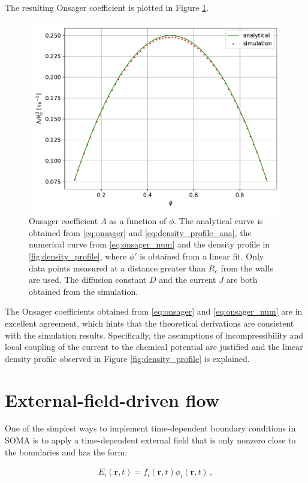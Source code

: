 \documentclass[bachelor,       %
               twoside,        %
               BCOR10mm,       %
               ngerman, english %
               ]{GAUBM}
\begin{document}
The resulting Onsager coefficient is plotted in Figure \ref{fig:onsager_coeff}.

\begin{figure}[h]
  \centering
  \includegraphics[width=0.6\linewidth]{figures/onsager_coll_diff.pdf}
  \caption{Onsager coefficient $\Lambda$ as a function of $\phi$. The analytical curve is obtained from \eqref{eq:onsager} and \eqref{eq:density_profile_ana}, the numerical curve from \eqref{eq:onsager_num} and the density profile in \ref{fig:density_profile}, where $\phi'$ is obtained from a linear fit. Only data points measured at a distance greater than $R_e$ from the walls are used. The diffusion constant $D$ and the current $J$ are both obtained from the simulation.}
  \label{fig:onsager_coeff}
\end{figure}

The Onsager coefficients obtained from \eqref{eq:onsager} and \eqref{eq:onsager_num} are in excellent agreement, which hints that the theoretical derivations are consistent with the simulation results. 
Specifically, the assumptions of incompressibility and local coupling of the current to the chemical potential are justified and the linear density profile observed in Figure \ref{fig:density_profile} is explained.


\chapter{External-field-driven flow}

One of the simplest ways to implement time-dependent boundary conditions in SOMA is to apply a time-dependent external field that is only nonzero close to the boundaries and has the form:

\begin{align}
    E_i(\mathbf{r},t)=f_i(\mathbf r,t)\phi_i({\mathbf r,t})\,,
\end{align}
\end{document}
